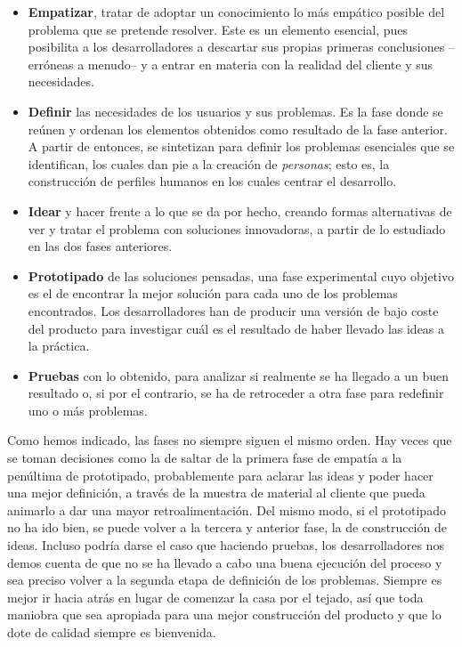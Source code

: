 \begin{itemize}
	\item \textbf{Empatizar}, tratar de adoptar un conocimiento lo más empático posible del problema que se pretende resolver. Este es un elemento esencial, pues posibilita a los desarrolladores a descartar sus propias primeras conclusiones --erróneas a menudo-- y a entrar en materia con la realidad del cliente y sus necesidades.
	
	\item \textbf{Definir} las necesidades de los usuarios y sus problemas. Es la fase donde se reúnen y ordenan los elementos obtenidos como resultado de la fase anterior. A partir de entonces, se sintetizan para definir los problemas esenciales que se identifican, los cuales dan pie a la creación de \textit{personas}; esto es, la construcción de perfiles humanos en los cuales centrar el desarrollo.
	
	\item \textbf{Idear} y hacer frente a lo que se da por hecho, creando formas alternativas de ver y tratar el problema con soluciones innovadoras, a partir de lo estudiado en las dos fases anteriores.
	
	\item \textbf{Prototipado} de las soluciones pensadas, una fase experimental cuyo objetivo es el de encontrar la mejor solución para cada uno de los problemas encontrados. Los desarrolladores han de producir una versión de bajo coste del producto para investigar cuál es el resultado de haber llevado las ideas a la práctica.
	
	\item \textbf{Pruebas} con lo obtenido, para analizar si realmente se ha llegado a un buen resultado o, si por el contrario, se ha de retroceder a otra fase para redefinir uno o más problemas.
	
\end{itemize}

Como hemos indicado, las fases no siempre siguen el mismo orden. Hay veces que se toman decisiones como la de saltar de la primera fase de empatía a la penúltima de prototipado, probablemente para aclarar las ideas y poder hacer una mejor definición, a través de la muestra de material al cliente que pueda animarlo a dar una mayor retroalimentación. Del mismo modo, si el prototipado no ha ido bien, se puede volver a la tercera y anterior fase, la de construcción de ideas. Incluso podría darse el caso que haciendo pruebas, los desarrolladores nos demos cuenta de que no se ha llevado a cabo una buena ejecución del proceso y sea preciso volver a la segunda etapa de definición de los problemas. Siempre es mejor ir hacia atrás en lugar de comenzar la casa por el tejado, así que toda maniobra que sea apropiada para una mejor construcción del producto y que lo dote de calidad siempre es bienvenida.


